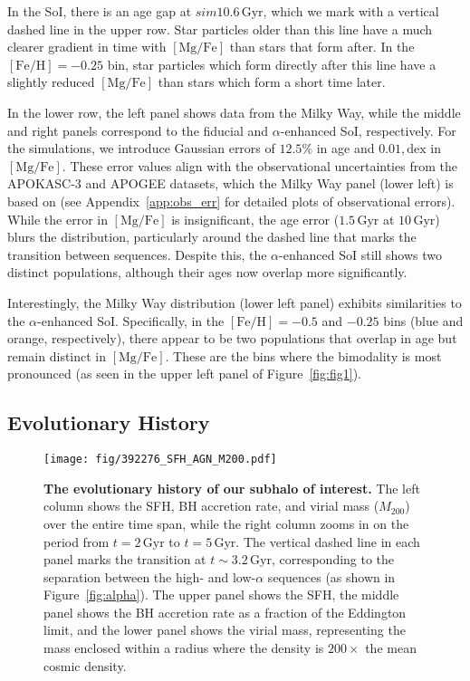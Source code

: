 \documentclass[twocolumn]{aastex631}
\newcommand{\Gyr}{\ensuremath{\textrm{Gyr}}}
\newcommand{\FeH}{\ensuremath{[\textrm{Fe}/\textrm{H}]}}
\newcommand{\MgFe}{\ensuremath{[\textrm{Mg}/\textrm{Fe}]}}
\newcommand{\dex}{\ensuremath{\textrm{dex}}}
\begin{document}
In the SoI, there is an age gap at $sim10.6\,\Gyr$, which we mark with a vertical dashed line in the upper row. Star particles older than this line have a much clearer gradient in time with \MgFe{} than stars that form after. In the $\FeH=-0.25$ bin, star particles which form directly after this line have a slightly reduced \MgFe{} than stars which form a short time later.

In the lower row, the left panel shows data from the Milky Way, while the middle and right panels correspond to the fiducial and $\alpha$-enhanced SoI, respectively. For the simulations, we introduce Gaussian errors of $12.5\%$ in age and $0.01,\dex$ in \MgFe{}. These error values align with the observational uncertainties from the APOKASC-3 and APOGEE datasets, which the Milky Way panel (lower left) is based on (see Appendix~\ref{app:obs_err} for detailed plots of observational errors). While the error in \MgFe{} is insignificant, the age error ($1.5\,\Gyr$ at $10\,\Gyr$) blurs the distribution, particularly around the dashed line that marks the transition between sequences. Despite this, the $\alpha$-enhanced SoI still shows two distinct populations, although their ages now overlap more significantly.

Interestingly, the Milky Way distribution (lower left panel) exhibits similarities to the $\alpha$-enhanced SoI. Specifically, in the $\FeH=-0.5$ and $-0.25$ bins (blue and orange, respectively), there appear to be two populations that overlap in age but remain distinct in \MgFe{}. These are the bins where the bimodality is most pronounced (as seen in the upper left panel of Figure~\ref{fig:fig1}).

\subsection{Evolutionary History}\label{ssec:evol}
\begin{figure}
  \centering
  \texttt{[image: fig/392276\_SFH\_AGN\_M200.pdf]}
  \caption{\textbf{The evolutionary history of our subhalo of interest.} The left column shows the SFH, BH accretion rate, and virial mass ($M_{200}$) over the entire time span, while the right column zooms in on the period from $t=2\,\Gyr$ to $t=5\,\Gyr$. The vertical dashed line in each panel marks the transition at $t\sim3.2\,\Gyr$, corresponding to the separation between the high- and low-$\alpha$ sequences (as shown in Figure~\ref{fig:alpha}). The upper panel shows the SFH, the middle panel shows the BH accretion rate as a fraction of the Eddington limit, and the lower panel shows the virial mass, representing the mass enclosed within a radius where the density is $200\times$ the mean cosmic density.}
  \label{fig:history}
\end{figure}
\end{document}
